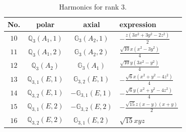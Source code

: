 \documentclass[fleqn,8pt,landscape]{jsarticle}
\begin{document}
\begin{table}[ht!]
\begin{center}
\caption{Harmonics for rank 3.}
\renewcommand{\arraystretch}{1.3}
\begin{tabular}{cccl} \hline \hline
No. & polar & axial & expression \\ \hline
$ 10 $ & $ \mathbb{Q}_{3}(A_{1},1) $ & $ \mathbb{G}_{3}(A_{2},1) $ & $ - \frac{z \left(3 x^{2} + 3 y^{2} - 2 z^{2}\right)}{2} $ \\
$ 11 $ & $ \mathbb{Q}_{3}(A_{1},2) $ & $ \mathbb{G}_{3}(A_{2},2) $ & $ \frac{\sqrt{10} x \left(x^{2} - 3 y^{2}\right)}{4} $ \\
$ 12 $ & $ \mathbb{Q}_{3}(A_{2}) $ & $ \mathbb{G}_{3}(A_{1}) $ & $ \frac{\sqrt{10} y \left(3 x^{2} - y^{2}\right)}{4} $ \\
$ 13 $ & $ \mathbb{Q}_{3,1}(E,1) $ & $ \mathbb{G}_{3,2}(E,1) $ & $ - \frac{\sqrt{6} x \left(x^{2} + y^{2} - 4 z^{2}\right)}{4} $ \\
$ 14 $ & $ \mathbb{Q}_{3,2}(E,1) $ & $ -\mathbb{G}_{3,1}(E,1) $ & $ - \frac{\sqrt{6} y \left(x^{2} + y^{2} - 4 z^{2}\right)}{4} $ \\
$ 15 $ & $ \mathbb{Q}_{3,1}(E,2) $ & $ -\mathbb{G}_{3,2}(E,2) $ & $ - \frac{\sqrt{15} z \left(x - y\right) \left(x + y\right)}{2} $ \\
$ 16 $ & $ \mathbb{Q}_{3,2}(E,2) $ & $ \mathbb{G}_{3,1}(E,2) $ & $ \sqrt{15} x y z $ \\
 \hline \hline
\end{tabular}
\end{center}
\end{table}
\end{document}
